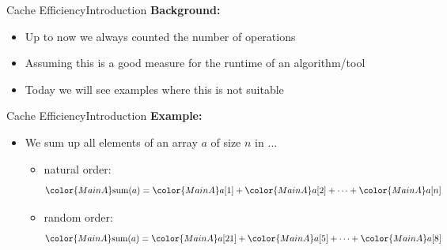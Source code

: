 

\begin{frame}{Cache Efficiency}{Introduction}
  \textbf{Background:}
  \begin{itemize}
    \item<2->
      Up to now we always counted the {\color{MainA}number of operations}
    \item<2->
      Assuming this is a good measure for the runtime of an algorithm/tool
    \item<3->
      Today we will see examples where this is not suitable
  \end{itemize}
\end{frame}


\begin{frame}{Cache Efficiency}{Introduction}
  \textbf{Example:}
  \begin{itemize}
    \item
      We sum up all elements of an array {\color{MainA}$a$} of size
      {\color{MainA}$n$} in $\ldots$
    \begin{itemize}
      \item
        natural order:
        \begin{displaymath}
          {\color{MainA}\mathrm{sum}(a)} =
          {\color{MainA}a[1]} +
          {\color{MainA}a[2]} +
          \dots +
          {\color{MainA}a[n]}
        \end{displaymath}
      \item
        random order:
        \begin{displaymath}
          {\color{MainA}\mathrm{sum}(a)} =
          {\color{MainA}a[21]} +
          {\color{MainA}a[5]} +
          \dots +
          {\color{MainA}a[8]}
        \end{displaymath}
    \end{itemize}
  \end{itemize}
\end{frame}



